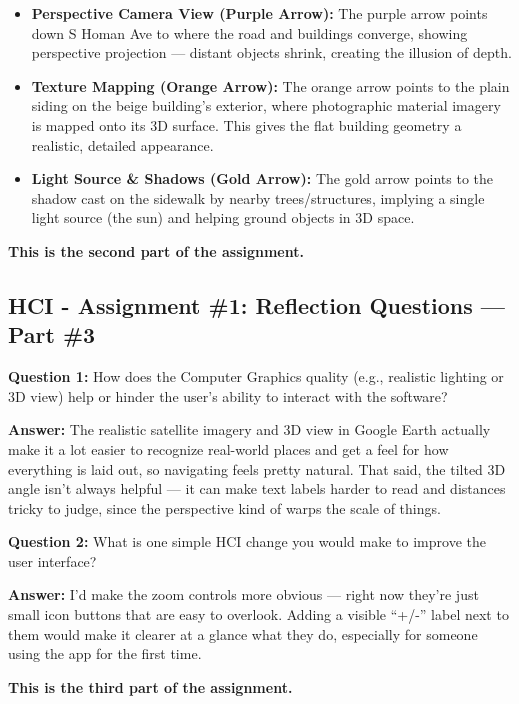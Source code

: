 \documentclass[12pt]{article}
\begin{document}
\begin{itemize}[leftmargin=1.2em, itemsep=6pt] 
    \vspace{12pt} \item \textbf{\textcolor{arrowpurple}{Perspective Camera View (Purple Arrow):}} The \textcolor{arrowpurple}{purple} arrow points down S Homan Ave to where the road and buildings converge, showing perspective projection --- distant objects shrink, creating the illusion of depth.

    \item \textbf{\textcolor{arroworange}{Texture Mapping (Orange Arrow):}} The \textcolor{arroworange}{orange} arrow points to the plain siding on the beige building's exterior, where photographic material imagery is mapped onto its 3D surface. This gives the flat building geometry a realistic, detailed appearance.

    \item \textbf{\textcolor{arrowgold}{Light Source \& Shadows (Gold Arrow):}} The \textcolor{arrowgold}{gold} arrow points to the shadow cast on the sidewalk by nearby trees/structures, implying a single light source (the sun) and helping ground objects in 3D space.
\end{itemize}

\vspace{12pt} \textbf{This is the second part of the assignment.}

\newpage

\begin{center}\section*{HCI - Assignment \#1: Reflection Questions --- Part \#3}\end{center} \vspace{12pt}

\textbf{Question 1:} How does the Computer Graphics quality (e.g., realistic lighting or 3D view) help or hinder the user's ability to interact with the software?

\textbf{Answer:} The realistic satellite imagery and 3D view in Google Earth actually make it a lot easier to recognize real-world places and get a feel for how everything is laid out, so navigating feels pretty natural. That said, the tilted 3D angle isn't always helpful --- it can make text labels harder to read and distances tricky to judge, since the perspective kind of warps the scale of things.

\vspace{0.5cm}

\textbf{Question 2:} What is one simple HCI change you would make to improve the user interface?

\textbf{Answer:} I'd make the zoom controls more obvious --- right now they're just small icon buttons that are easy to overlook. Adding a visible ``+/-'' label next to them would make it clearer at a glance what they do, especially for someone using the app for the first time.

\vspace{1cm}
\textbf{This is the third part of the assignment.}
\end{document}
